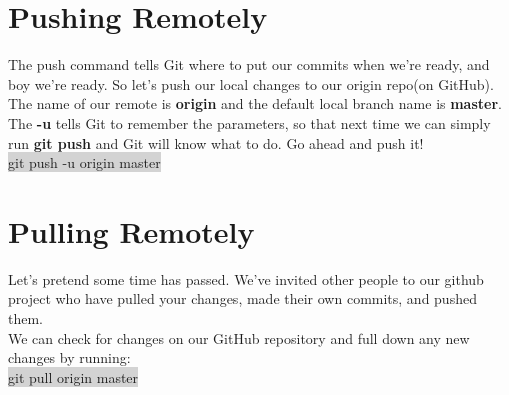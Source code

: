 \documentclass{article}
\begin{document}
\section{Pushing Remotely}
\begin{minipage}[c]{0.66\textwidth}
	\parbox{\textwidth}{
		The push command tells Git where to put our commits when we're ready, and boy we're ready. So let's push our local changes to our origin repo(on GitHub).\\
		The name of our remote is \textbf{origin} and the default local branch name is \textbf{master}. The \textbf{-u} tells Git to remember the parameters, so that next time we can simply run \textbf{git push} and Git will know what to do. Go ahead and push it!\\
	\colorbox{lightgray}{ git push -u origin master}\\
	}
\end{minipage}
\hfill
\begin{minipage}[c]{0.32\textwidth}
\end{minipage}

\section{Pulling Remotely}
\begin{minipage}[c]{0.66\textwidth}
	\parbox{\textwidth}{
		Let's pretend some time has passed. We've invited other people to our github project who have pulled your changes, made their own commits, and pushed them.\\
		We can check for changes on our GitHub repository and full down any new changes by running:\\
		\colorbox{lightgray}{ git pull origin master}\\
	}
\end{minipage}
\hfill
\begin{minipage}[c]{0.32\textwidth}
\end{minipage}
\end{document}
